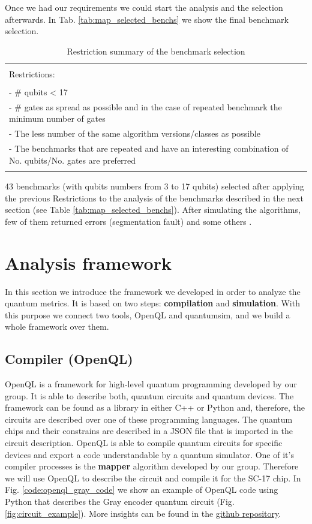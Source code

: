 Once we had our requirements we could start the analysis and the selection afterwards.
In Tab. \ref{tab:map_selected_benchs} we show the final benchmark selection.
\begin{table}[htbp]
\caption{\label{tab:org312b0df}
Restriction summary of the benchmark selection}
\centering
\begin{tabular}{|l|}
\hline
\\
Restrictions:\\
\\
- \# qubits < 17\\
- \# gates as spread as possible and in the case of repeated benchmark the minimum number of gates\\
- The less number of the same algorithm versions/classes as possible\\
- The benchmarks that are repeated and have an interesting combination of No. qubits/No. gates are  preferred\\
\\
\hline
\end{tabular}
\end{table}
43 benchmarks (with qubits numbers from 3 to 17 qubits) selected after applying the previous Restrictions to the analysis of the benchmarks described in the next section (see Table \ref{tab:map_selected_benchs}).
After simulating the algorithms, few of them returned errors (segmentation fault) and some others .

\section*{Analysis framework}
\label{sec:orge875139}
In this section we introduce the framework we developed in order to analyze the quantum metrics.
It is based on two steps: \textbf{compilation} and \textbf{simulation}.
With this purpose we connect two tools, OpenQL and quantumsim, and we build a whole framework over them.

\subsection*{Compiler (OpenQL)}
\label{sec:orgc4198e6}
OpenQL is a framework for high-level quantum programming developed by our group.
It is able to describe both, quantum circuits and quantum devices.
The framework can be found as a library in either C++ or Python and, therefore, the circuits are described over one of these programming languages.
The quantum chips and their constrains are described in a JSON file that is imported in the circuit description.
OpenQL is able to compile quantum circuits for specific devices and export a code understandable by a quantum simulator.
One of it's compiler processes is the \textbf{mapper} algorithm developed by our group.
Therefore we will use OpenQL to describe the circuit and compile it for the SC-17 chip.
In Fig. \ref{code:openql_gray_code} we show an example of OpenQL code using Python that describes the Gray encoder quantum circuit (Fig. \ref{fig:circuit_example}).
More insights can be found in the \href{https://github.com/QE-Lab/OpenQL}{github repository}.

